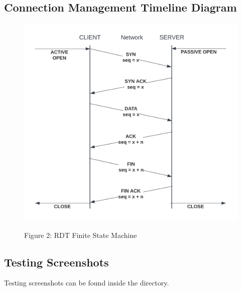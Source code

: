 \subsection{Connection Management Timeline Diagram}
\begin{figure}[H]
\begin{center}
\includegraphics[width=170mm]{images/timeline.png}
\end{center}
\begin{center}
    Figure 2: RDT Finite State Machine
\end{center}
\end{figure}

\newpage
\subsection{Testing Screenshots}
\label{testing-screenshots}
Testing screenshots can be found inside the  directory.